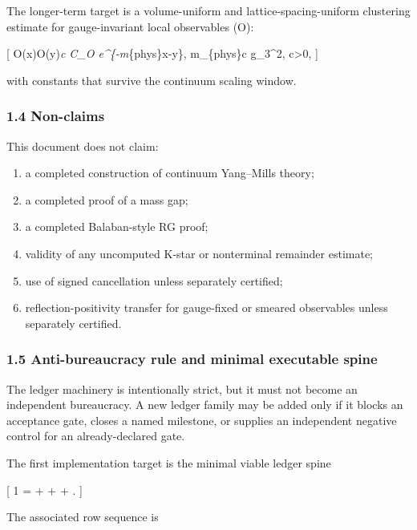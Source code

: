 \documentclass[
]{article}
\providecommand{\tightlist}{%
  \setlength{\itemsep}{0pt}\setlength{\parskip}{0pt}}
\begin{document}
The longer-term target is a volume-uniform and lattice-spacing-uniform
clustering estimate for gauge-invariant local observables (O):

{[} \left\textbar{}\langle O(x)O(y)\rangle\emph{c\right\textbar{} \le
C\_O e\^{}\{-m}\{\rm phys\}\textbar x-y\textbar\}, \qquad
m\_\{\rm phys\}\ge c g\_3\^{}2, \qquad c\textgreater0, {]}

with constants that survive the continuum scaling window.

\subsubsection{1.4 Non-claims}\label{non-claims}

This document does not claim:

\begin{enumerate}
\def\labelenumi{\arabic{enumi}.}
\tightlist
\item
  a completed construction of continuum Yang--Mills theory;
\item
  a completed proof of a mass gap;
\item
  a completed Balaban-style RG proof;
\item
  validity of any uncomputed K-star or nonterminal remainder estimate;
\item
  use of signed cancellation unless separately certified;
\item
  reflection-positivity transfer for gauge-fixed or smeared observables
  unless separately certified.
\end{enumerate}

\subsubsection{1.5 Anti-bureaucracy rule and minimal executable
spine}\label{anti-bureaucracy-rule-and-minimal-executable-spine}

The ledger machinery is intentionally strict, but it must not become an
independent bureaucracy. A new ledger family may be added only if it
blocks an acceptance gate, closes a named milestone, or supplies an
independent negative control for an already-declared gate.

The first implementation target is the minimal viable ledger spine

{[} \text{-}1 =  +  +
 + . {]}

The associated row sequence is
\end{document}
